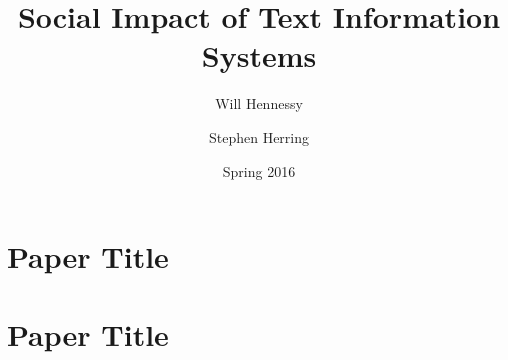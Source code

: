 \documentclass[11pt]{article}
\title{Social Impact of Text Information Systems}
\author{Will Hennessy \and Stephen Herring}
\date{Spring 2016}
\begin{document}
\maketitle


\section*{Paper Title}


\newpage

\section*{Paper Title}


%
%
%
%
%
%
%
%
%
%
%
%
%
%
%
%
%
%
%
%
%
%
%
\end{document}
